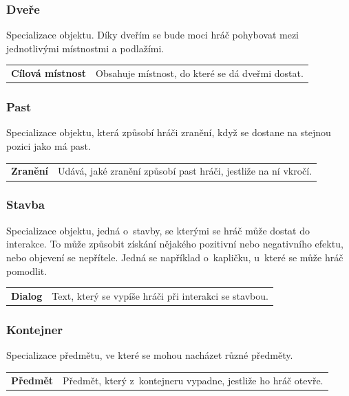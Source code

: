 \documentclass[12pt,a4paper]{article}
\begin{document}
\subsubsection{Dveře}
Specializace objektu. Díky dveřím se bude moci hráč pohybovat mezi jednotlivými
místnostmi a podlažími.\\[5pt]
\begin{tabular*}{0.87\textwidth}{ll}
  \bf Cílová místnost & Obsahuje místnost, do které se dá dveřmi dostat.
\end{tabular*}

\subsubsection{Past}
Specializace objektu, která způsobí hráči zranění, když se dostane na stejnou
pozici jako má past.\\[5pt]

\begin{tabular*}{0.87\textwidth}{ll}
  \bf Zranění & Udává, jaké zranění způsobí past hráči, jestliže na ní
  vkročí.\\[7pt]
\end{tabular*}

\subsubsection{Stavba}
Specializace objektu, jedná o~stavby, se kterými se hráč může dostat do
interakce. To může způsobit získání nějakého pozitivní nebo negativního efektu,
nebo objevení se nepřítele. Jedná se například o~kapličku, u~které se může hráč
pomodlit.\\[5pt]

\begin{tabular*}{0.87\textwidth}{ll}
  \bf Dialog & Text, který se vypíše hráči při interakci se stavbou.\\[7pt]
\end{tabular*}

\subsubsection{Kontejner}
Specializace předmětu, ve které se mohou nacházet různé předměty.\\[5pt]

\begin{tabular*}{0.87\textwidth}{ll}
  \bf Předmět & Předmět, který z~kontejneru vypadne, jestliže ho hráč
  otevře.\\[7pt]
\end{tabular*}
\end{document}
